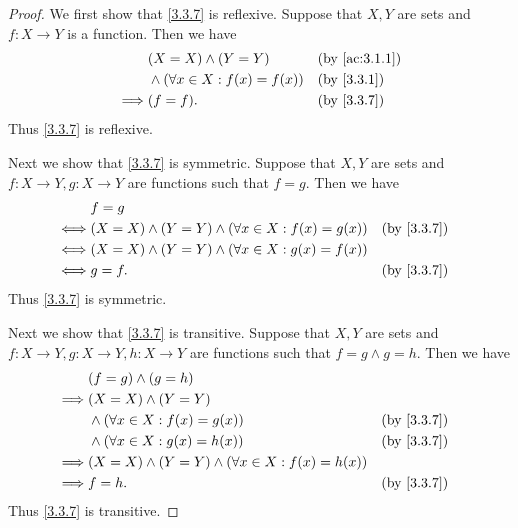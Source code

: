 \begin{proof}
  We first show that \cref{3.3.7} is reflexive.
  Suppose that \(X, Y\) are sets and \(f : X \to Y\) is a function.
  Then we have
  \begin{align*}
             & (X = X) \land (Y = Y)                 &  & \by{ac:3.1.1} \\
             & \land (\forall x \in X : f(x) = f(x)) &  & \by{3.3.1}    \\
    \implies & (f = f).                              &  & \by{3.3.7}
  \end{align*}
  Thus \cref{3.3.7} is reflexive.

  Next we show that \cref{3.3.7} is symmetric.
  Suppose that \(X, Y\) are sets and \(f : X \to Y, g : X \to Y\) are functions such that \(f = g\).
  Then we have
  \begin{align*}
         & f = g                                                                       \\
    \iff & (X = X) \land (Y = Y) \land (\forall x \in X : f(x) = g(x)) &  & \by{3.3.7} \\
    \iff & (X = X) \land (Y = Y) \land (\forall x \in X : g(x) = f(x))                 \\
    \iff & g = f.                                                      &  & \by{3.3.7}
  \end{align*}
  Thus \cref{3.3.7} is symmetric.

  Next we show that \cref{3.3.7} is transitive.
  Suppose that \(X, Y\) are sets and \(f : X \to Y, g : X \to Y, h : X \to Y\) are functions such that \(f = g \land g = h\).
  Then we have
  \begin{align*}
             & (f = g) \land (g = h)                                                       \\
    \implies & (X = X) \land (Y = Y)                                                       \\
             & \land (\forall x \in X : f(x) = g(x))                       &  & \by{3.3.7} \\
             & \land (\forall x \in X : g(x) = h(x))                       &  & \by{3.3.7} \\
    \implies & (X = X) \land (Y = Y) \land (\forall x \in X : f(x) = h(x))                 \\
    \implies & f = h.                                                      &  & \by{3.3.7}
  \end{align*}
  Thus \cref{3.3.7} is transitive.


\end{proof}
